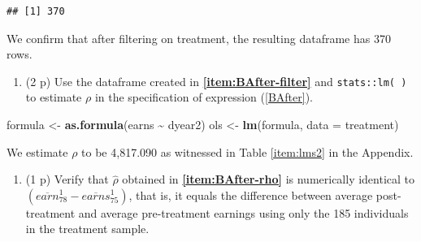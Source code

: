 \documentclass[
]{article}
\newenvironment{Shaded}{\begin{snugshade}}{\end{snugshade}}
\newcommand{\AttributeTok}[1]{\textcolor[rgb]{0.13,0.29,0.53}{#1}}
\newcommand{\DecValTok}[1]{\textcolor[rgb]{0.00,0.00,0.81}{#1}}
\newcommand{\FunctionTok}[1]{\textcolor[rgb]{0.13,0.29,0.53}{\textbf{#1}}}
\newcommand{\NormalTok}[1]{#1}
\newcommand{\OtherTok}[1]{\textcolor[rgb]{0.56,0.35,0.01}{#1}}
\newcommand{\SpecialCharTok}[1]{\textcolor[rgb]{0.81,0.36,0.00}{\textbf{#1}}}
\providecommand{\tightlist}{%
  \setlength{\itemsep}{0pt}\setlength{\parskip}{0pt}}
\begin{document}
\begin{verbatim}
## [1] 370
\end{verbatim}

We confirm that after filtering on treatment, the resulting dataframe
has 370 rows.

\begin{enumerate}
\def\labelenumi{\alph{enumi}.}
\setcounter{enumi}{2}
\tightlist
\item
  (2 p) Use the dataframe created in \textbf{\ref{item:BAfter-filter}}
  and \texttt{stats::lm( )} to estimate \(\rho\) in the specification of
  expression (\ref{BAfter}).\label{item:BAfter-rho}
\end{enumerate}

\begin{Shaded}
\begin{Highlighting}[]
\NormalTok{formula }\OtherTok{\textless{}{-}} \FunctionTok{as.formula}\NormalTok{(earns }\SpecialCharTok{\textasciitilde{}}\NormalTok{ dyear2)}
\NormalTok{ols }\OtherTok{\textless{}{-}} \FunctionTok{lm}\NormalTok{(formula, }\AttributeTok{data =}\NormalTok{ treatment)}
\end{Highlighting}
\end{Shaded}

We estimate \(\rho\) to be 4,817.090 as witnessed in Table
\ref{item:lms2} in the Appendix. \newpage 

\begin{enumerate}
\def\labelenumi{\alph{enumi}.}
\setcounter{enumi}{3}
\tightlist
\item
  (1 p) Verify that \(\hat{\rho}\) obtained in
  \textbf{\ref{item:BAfter-rho}} is numerically identical to
  \(\left( \overline{earn}_{78}^{1}-\overline{earns}_{75}^{1}\right)\),
  that is, it equals the difference between average post-treatment and
  average pre-treatment earnings using only the 185 individuals in the
  treatment sample.\label{item:BAfter-diff}
\end{enumerate}

\begin{Shaded}
\end{Shaded}
\end{document}
